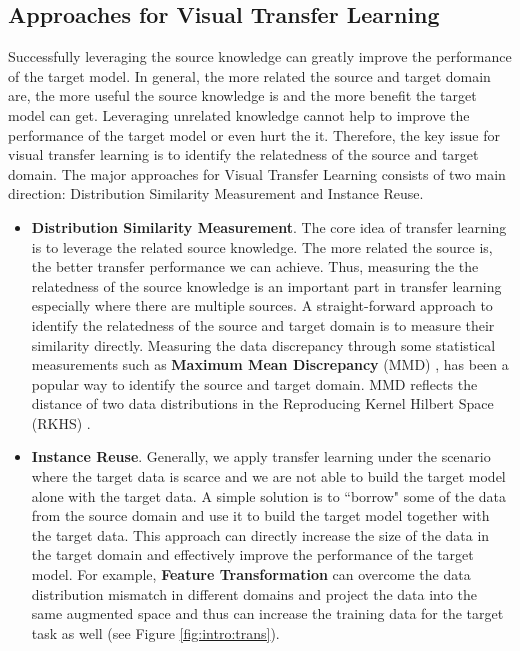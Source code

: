\subsection{Approaches for Visual Transfer Learning}
Successfully leveraging the source knowledge can greatly improve the performance of the target model. In general, the more related the source and target domain are, the more useful the source knowledge is and the more benefit the target model can get. Leveraging unrelated knowledge cannot help to improve the performance of the target model or even hurt the it. Therefore, the key issue for visual transfer learning is to identify the relatedness of the source and target domain. The major approaches for Visual Transfer Learning consists of two main direction: Distribution Similarity Measurement and Instance Reuse.

\begin{itemize}
	\item \textbf{Distribution Similarity Measurement}. The core idea of transfer learning is to leverage the related source knowledge. The more related the source is, the better transfer performance we can achieve. Thus, measuring the the relatedness of the source knowledge is an important part in transfer learning especially where there are multiple sources. A straight-forward approach to identify the relatedness of the source and target domain is to measure their similarity directly. Measuring the data discrepancy through some statistical measurements such as \textbf{Maximum Mean Discrepancy} (MMD) \cite{duan2009domain}, has been a popular way to identify the source and target domain. MMD reflects the distance of two data distributions in the Reproducing Kernel Hilbert Space (RKHS) \cite{aronszajn1950theory}.
	\item \textbf{Instance Reuse}\cite{lim2012transfer}. Generally, we apply transfer learning under the scenario where the target data is scarce and we are not able to build the target model alone with the target data. A simple solution is to ``borrow" some of the data from the source domain and use it to build the target model together with the target data. This approach can directly increase the size of the data in the target domain and effectively improve the performance of the target model. For example, \textbf{Feature Transformation} \cite{duan2012learning} can overcome the data distribution mismatch in different domains and project the data into the same augmented space and thus can increase the training data for the target task as well (see Figure \ref{fig:intro:trans}).
\end{itemize}

